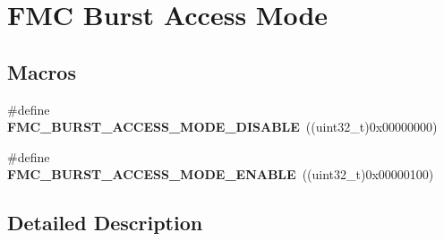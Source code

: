 \hypertarget{group___f_m_c___burst___access___mode}{}\section{F\+MC Burst Access Mode}
\label{group___f_m_c___burst___access___mode}
\subsection*{Macros}
\begin{DoxyCompactItemize}
\item 
\#define {\bfseries F\+M\+C\+\_\+\+B\+U\+R\+S\+T\+\_\+\+A\+C\+C\+E\+S\+S\+\_\+\+M\+O\+D\+E\+\_\+\+D\+I\+S\+A\+B\+LE}~((uint32\+\_\+t)0x00000000)\hypertarget{group___f_m_c___burst___access___mode_ga7d07740e2e5b8bae56f9f78e07354bb9}{}\label{group___f_m_c___burst___access___mode_ga7d07740e2e5b8bae56f9f78e07354bb9}

\item 
\#define {\bfseries F\+M\+C\+\_\+\+B\+U\+R\+S\+T\+\_\+\+A\+C\+C\+E\+S\+S\+\_\+\+M\+O\+D\+E\+\_\+\+E\+N\+A\+B\+LE}~((uint32\+\_\+t)0x00000100)\hypertarget{group___f_m_c___burst___access___mode_gace7c535743e9e59f821645f923966b82}{}\label{group___f_m_c___burst___access___mode_gace7c535743e9e59f821645f923966b82}

\end{DoxyCompactItemize}


\subsection{Detailed Description}
